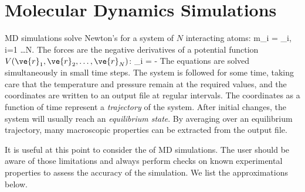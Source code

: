 \section{Molecular Dynamics Simulations}
\label{sec:MDsimulations}
MD simulations solve Newton's  
for a system of $N$ interacting atoms:
\beq
  m_i   = _i, \;i=1 \ldots N.
\eeq
The forces are the negative derivatives of a potential function $V(\ve{r}_1, 
\ve{r}_2, \ldots, \ve{r}_N)$:
\beq
  _i = - 
\eeq
The equations are solved simultaneously in small time steps. The
system is followed for some time, taking care that the temperature and
pressure remain at the required values, and the coordinates are
written to an output file at regular intervals. The coordinates as a
function of time represent a {\em trajectory} of the system. After
initial changes, the system will usually reach an {\em equilibrium
state}. By averaging over an equilibrium trajectory, many macroscopic
properties can be extracted from the output file.

It is useful at this point to consider the  of MD
simulations. The user should be aware of those limitations and always
perform checks on known experimental properties to assess the accuracy
of the simulation. We list the approximations below.

